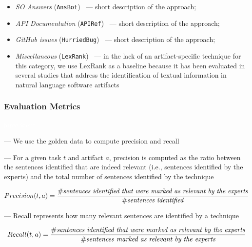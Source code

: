 \begin{itemize}[leftmargin=\parindent, font=\normalfont\itshape]
    \item \textit{SO Answers} (\texttt{AnsBot})~\cite{Xu2017} --- short description of the approach;
    
    \item \textit{API Documentation} (\texttt{APIRef})~\cite{Robillard2015} --- short description of the approach;
    
    \item \textit{GitHub issues} (\texttt{HurriedBug})~\cite{Lotufo2012} --- short description of the approach;

    \item \textit{Miscellaneous} (\texttt{LexRank})~\cite{Erkan2004} --- in the lack of an artifact-specific technique for this category, we use LexRank as a baseline because it has been evaluated in several studies that address the identification of textual information in natural language software artifacts~\cite{nadi2020, Ponzanelli2017}
\end{itemize}






\subsubsection{Evaluation Metrics}
\textcolor{white}{force ident} %

--- We use the golden data to compute precision and recall


--- For a given task $t$ and artifact $a$, precision is computed as the ratio between the sentences identified that are indeed relevant (i.e., sentences identified by the experts) and the total number of sentences identified by the technique


\begin{equation}
    Precision(t, a) = \frac{\# \text{\textit{sentences identified that were marked as relevant by the experts}}}{\# \text{\textit{sentences identified}}}
\end{equation}

\vspace{3mm}

--- Recall represents how many relevant sentences are identified by a technique


\begin{equation}
    Recall(t, a) = \frac{\# \text{\textit{sentences identified that were marked as relevant by the experts}}}{\# \text{\textit{sentences marked as relevant by the experts}}}
\end{equation}

